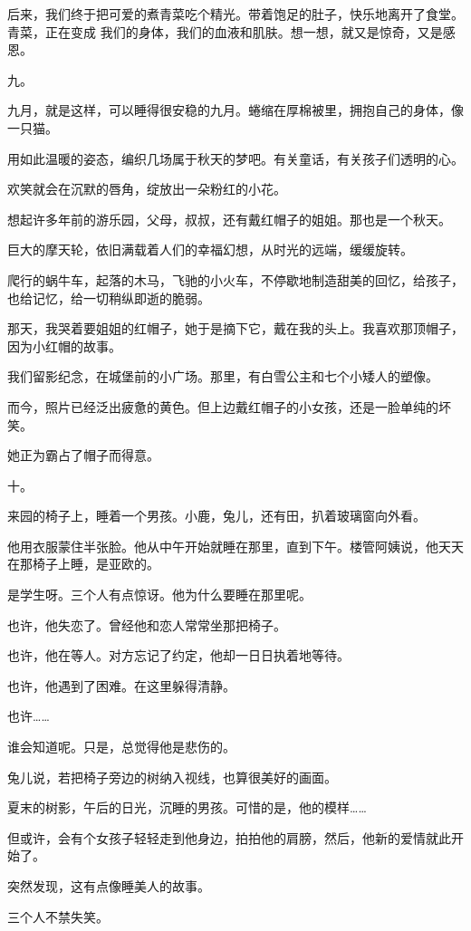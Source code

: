\documentclass[12pt,a4paper]{article}
\newcommand{\subpart}[1]{
	\begingroup \par
	\vspace{1ex} \centering #1
	\par \endgroup \nopagebreak[4]
}
\begin{document}
		后来，我们终于把可爱的煮青菜吃个精光。带着饱足的肚子，快乐地离开了食堂。青菜，正在变成
	我们的身体，我们的血液和肌肤。想一想，就又是惊奇，又是感恩。

	\endwriting



		\subpart{九。}

		九月，就是这样，可以睡得很安稳的九月。蜷缩在厚棉被里，拥抱自己的身体，像一只猫。\par
		用如此温暖的姿态，编织几场属于秋天的梦吧。有关童话，有关孩子们透明的心。\par
		欢笑就会在沉默的唇角，绽放出一朵粉红的小花。\par
		想起许多年前的游乐园，父母，叔叔，还有戴红帽子的姐姐。那也是一个秋天。\par
		巨大的摩天轮，依旧满载着人们的幸福幻想，从时光的远端，缓缓旋转。\par
		爬行的蜗牛车，起落的木马，飞驰的小火车，不停歇地制造甜美的回忆，给孩子，也给记忆，给一切稍纵即逝的脆弱。\par
		那天，我哭着要姐姐的红帽子，她于是摘下它，戴在我的头上。我喜欢那顶帽子，因为小红帽的故事。\par
		我们留影纪念，在城堡前的小广场。那里，有白雪公主和七个小矮人的塑像。\par
		而今，照片已经泛出疲惫的黄色。但上边戴红帽子的小女孩，还是一脸单纯的坏笑。\par
		她正为霸占了帽子而得意。

		\subpart{十。}

		来园的椅子上，睡着一个男孩。小鹿，兔儿，还有田，扒着玻璃窗向外看。\par
		他用衣服蒙住半张脸。他从中午开始就睡在那里，直到下午。楼管阿姨说，他天天在那椅子上睡，是亚欧的。\par
		是学生呀。三个人有点惊讶。他为什么要睡在那里呢。\par
		也许，他失恋了。曾经他和恋人常常坐那把椅子。\par
		也许，他在等人。对方忘记了约定，他却一日日执着地等待。\par
		也许，他遇到了困难。在这里躲得清静。\par
		也许……\par
		谁会知道呢。只是，总觉得他是悲伤的。\par
		兔儿说，若把椅子旁边的树纳入视线，也算很美好的画面。\par
		夏末的树影，午后的日光，沉睡的男孩。可惜的是，他的模样……\par
		但或许，会有个女孩子轻轻走到他身边，拍拍他的肩膀，然后，他新的爱情就此开始了。\par
		突然发现，这有点像睡美人的故事。\par
		三个人不禁失笑。
\end{document}
